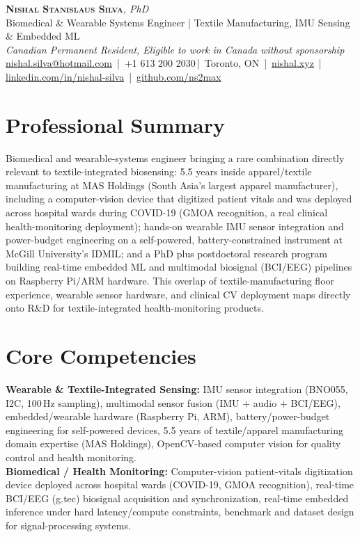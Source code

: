 \documentclass[11pt]{article}
\makeatletter
\newcommand{\cvName}{Nishal Stanislaus Silva}
\newcommand{\cvEmail}{nishal.silva@hotmail.com}
\newcommand{\cvPhone}{+1 613 200 2030}
\newcommand{\cvCity}{Toronto, ON}
\newcommand{\cvSite}{https://nishal.xyz}
\newcommand{\cvLinkedIn}{https://www.linkedin.com/in/nishal-silva}
\newcommand{\cvGitHub}{https://github.com/ns2max}
\newcommand{\cvStatus}{Canadian Permanent Resident, Eligible to work in Canada without sponsorship}
\newcommand{\cvTagline}{Biomedical \& Wearable Systems Engineer | Textile Manufacturing, IMU Sensing \& Embedded ML}
\makeatother
\begin{document}
\pagestyle{empty}
\begin{center}
    {\LARGE \scshape \textbf{\cvName}}{\large \textit{, PhD}}\\[1pt]
    {\small \cvTagline}\\[1pt]
    {\footnotesize\textit{\cvStatus}}\\[1pt]
    {\small
    \href{mailto:\cvEmail}{\cvEmail} \,|\, \cvPhone \,|\, \cvCity
    \,|\, \href{\cvSite}{nishal.xyz} \,|\, \href{\cvLinkedIn}{linkedin.com/in/nishal-silva}
    \,|\, \href{\cvGitHub}{github.com/ns2max}}
\end{center}

\section*{Professional Summary}
Biomedical and wearable-systems engineer bringing a rare combination directly relevant to textile-integrated biosensing: 5.5 years inside apparel/textile manufacturing at MAS Holdings (South Asia's largest apparel manufacturer), including a computer-vision device that digitized patient vitals and was deployed across hospital wards during COVID-19 (GMOA recognition, a real clinical health-monitoring deployment); hands-on wearable IMU sensor integration and power-budget engineering on a self-powered, battery-constrained instrument at McGill University's IDMIL; and a PhD plus postdoctoral research program building real-time embedded ML and multimodal biosignal (BCI/EEG) pipelines on Raspberry Pi/ARM hardware. This overlap of textile-manufacturing floor experience, wearable sensor hardware, and clinical CV deployment maps directly onto R\&D for textile-integrated health-monitoring products.

\section*{Core Competencies}
\textbf{Wearable \& Textile-Integrated Sensing:} IMU sensor integration (BNO055, I2C, 100\,Hz sampling), multimodal sensor fusion (IMU + audio + BCI/EEG), embedded/wearable hardware (Raspberry Pi, ARM), battery/power-budget engineering for self-powered devices, 5.5 years of textile/apparel manufacturing domain expertise (MAS Holdings), OpenCV-based computer vision for quality control and health monitoring. \\
\textbf{Biomedical / Health Monitoring:} Computer-vision patient-vitals digitization device deployed across hospital wards (COVID-19, GMOA recognition), real-time BCI/EEG (g.tec) biosignal acquisition and synchronization, real-time embedded inference under hard latency/compute constraints, benchmark and dataset design for signal-processing systems.
\end{document}
